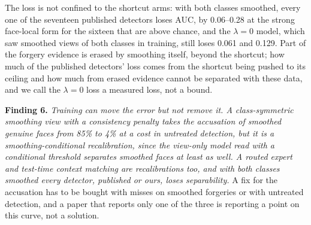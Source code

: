 \documentclass[journal]{IEEEtran}  %
\begin{document}
The loss is not confined to the shortcut arms: with both classes smoothed, every one of the seventeen published detectors
loses AUC, by 0.06--0.28 at
the strong face-local form for the sixteen that are above chance, and the $\lambda=0$ model, which saw smoothed views of both
classes in training, still loses 0.061 and 0.129.
Part of the forgery evidence is erased by smoothing itself, beyond the shortcut; how much of the published detectors'
loss comes from the shortcut being pushed to its ceiling and how much from erased evidence cannot be separated with these
data, and we call the $\lambda=0$ loss a measured loss, not a bound.

\textbf{Finding 6.} \emph{Training can move the error but not remove it. A class-symmetric smoothing view with a
consistency penalty takes the accusation of smoothed genuine faces from 85\% to 4\% at a cost in untreated detection, but it is
a smoothing-conditional recalibration, since the view-only model read with a conditional threshold separates smoothed
faces at least as well. A routed expert and test-time context matching are recalibrations too, and with both classes
smoothed every detector, published or ours, loses separability.}
A fix for the accusation has to be bought with misses on smoothed forgeries or with untreated detection, and a
paper that reports only one of the three is reporting a point on this curve, not a solution.
\end{document}
